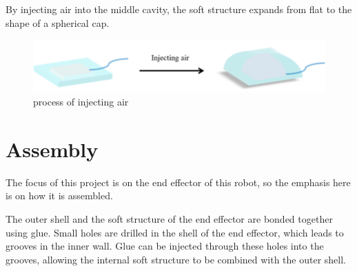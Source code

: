 \documentclass[10pt, a4paper, twocolumn]{article}
\begin{document}
By injecting air into the middle cavity, the soft structure expands from flat to the shape of a spherical cap.

\begin{figure}
    \centering
    \includegraphics[width=0.8\linewidth]{process of injecting air.png}
    \caption{process of injecting air}
    \label{fig:process of injecting air}
\end{figure}

\section{Assembly}
The focus of this project is on the end effector of this robot, so the emphasis here is on how it is assembled.

The outer shell and the soft structure of the end effector are bonded together using glue. Small holes are drilled in the shell of the end effector, which leads to grooves in the inner wall. Glue can be injected through these holes into the grooves, allowing the internal soft structure to be combined with the outer shell.





\end{document}
